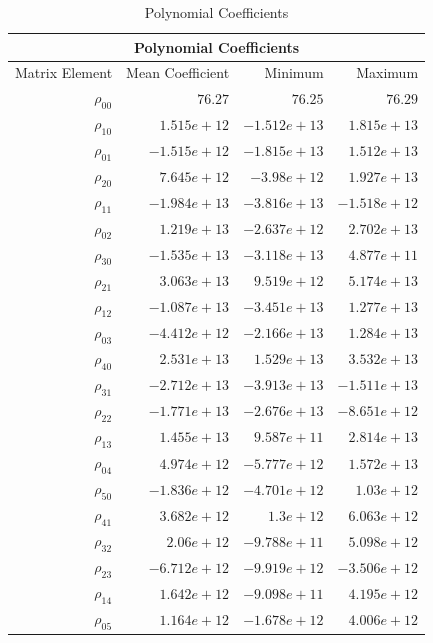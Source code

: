 \documentclass[11pt,a4paper]{article}
\begin{document}
\begin{table}[!hbt]
    \centering
    \caption{Polynomial Coefficients}
    \begin{tabular}{|r||r|r|r|}
        \hline
            \multicolumn{4}{|c|}{Polynomial Coefficients} \\
        \hline
            Matrix Element & Mean Coefficient & Minimum & Maximum\\
        \hline
            $\rho_{00}$ & $76.27$      & $76.25$      & $76.29$\\
            $\rho_{10}$ & $1.515e+12$  & $-1.512e+13$ & $1.815e+13$\\
            $\rho_{01}$ & $-1.515e+12$ & $-1.815e+13$ & $1.512e+13$\\
            $\rho_{20}$ & $7.645e+12$  & $-3.98e+12$  & $1.927e+13$\\
            $\rho_{11}$ & $-1.984e+13$ & $-3.816e+13$ & $-1.518e+12$\\
            $\rho_{02}$ & $1.219e+13$  & $-2.637e+12$ & $2.702e+13$\\
            $\rho_{30}$ & $-1.535e+13$ & $-3.118e+13$ & $4.877e+11$\\
            $\rho_{21}$ & $3.063e+13$  & $9.519e+12$  & $5.174e+13$\\
            $\rho_{12}$ & $-1.087e+13$ & $-3.451e+13$ & $1.277e+13$\\
            $\rho_{03}$ & $-4.412e+12$ & $-2.166e+13$ & $1.284e+13$\\
            $\rho_{40}$ & $2.531e+13$  & $1.529e+13$  & $3.532e+13$\\
            $\rho_{31}$ & $-2.712e+13$ & $-3.913e+13$ & $-1.511e+13$\\
            $\rho_{22}$ & $-1.771e+13$ & $-2.676e+13$ & $-8.651e+12$\\
            $\rho_{13}$ & $1.455e+13$  & $9.587e+11$  & $2.814e+13$\\
            $\rho_{04}$ & $4.974e+12$  & $-5.777e+12$ & $1.572e+13$\\
            $\rho_{50}$ & $-1.836e+12$ & $-4.701e+12$ & $1.03e+12$\\
            $\rho_{41}$ & $3.682e+12$  & $1.3e+12$    & $6.063e+12$\\
            $\rho_{32}$ & $2.06e+12$   & $-9.788e+11$ & $5.098e+12$\\
            $\rho_{23}$ & $-6.712e+12$ & $-9.919e+12$ & $-3.506e+12$\\
            $\rho_{14}$ & $1.642e+12$  & $-9.098e+11$ & $4.195e+12$\\
            $\rho_{05}$ & $1.164e+12$  & $-1.678e+12$ & $4.006e+12$\\
        \hline
    \end{tabular}
    \label{tab:polynomial_coefficients}
\end{table}
\end{document}

